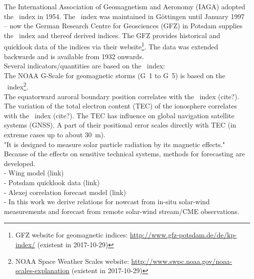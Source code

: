The International Association of Geomagnetism and Aeronomy (IAGA) adopted the \Kp{}~index in 1954. The \Kp{}~index was maintained in Göttingen until January 1997 -- now the German Research Centre for Geosciences (GFZ) in Potsdam supplies the \Kp{}~index and thereof derived indices. The GFZ provides historical and quicklook data of the indices via their website\footnote{GFZ website for geomagnetic indices: \url{http://www.gfz-potsdam.de/de/kp-index/} (existent in 2017-10-29)}. The data was extended backwards and is available from 1932 onwards.\\

Several indicators/quantities are based on the \Kp{}~index:\\
The NOAA G-Scale for geomagnetic storms (G~1 to G~5) is based on the \Kp~index\footnote{NOAA Space Weather Scales website: \url{http://www.swpc.noaa.gov/noaa-scales-explanation} (existent in 2017-10-29)}.\\
The equatorward auroral boundary position correlates with the \Kp~index (cite?).\\
The variation of the total electron content (TEC) of the ionosphere correlates with the \Kp~index (cite?). The TEC has influence on global navigation satellite systems (GNSS). A part of their positional error scales directly with TEC (in extreme cases up to about \SI{30}{\m}).\\

"It is designed to measure solar particle radiation by its magnetic effects."\\

Because of the effects on sensitive technical systems, methods for \Kp{} forecasting are developed.\\
- Wing \Kp{} model (link)\\
- Potsdam quicklook data (link)\\
- Alexej \Kp{} correlation forecast model (link)\\
- In this work we derive relations for \Kp{} nowcast from in-situ solar-wind measurements and \Kp{} forecast from remote solar-wind stream/CME observations.\\



